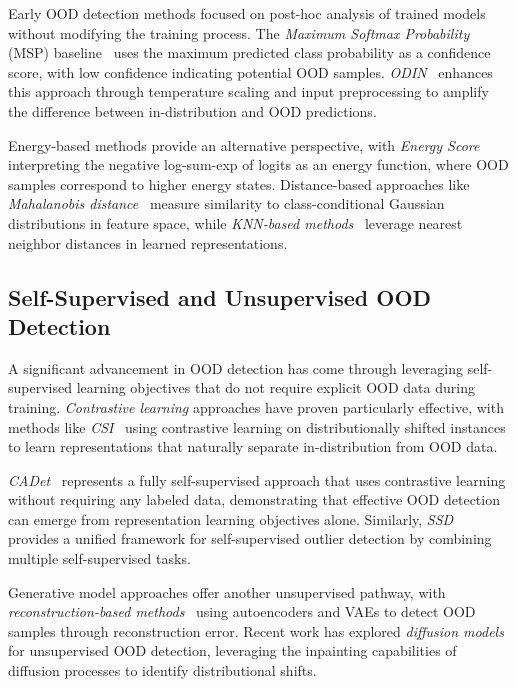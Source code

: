 \documentclass[11pt, oneside]{book}
\theoremstyle{plain}
\theoremstyle{definition}
\theoremstyle{remark}
\begin{document}
Early OOD detection methods focused on post-hoc analysis of trained models without modifying the training process. The \emph{Maximum Softmax Probability} (MSP) baseline~\citep{hendrycks2016baseline} uses the maximum predicted class probability as a confidence score, with low confidence indicating potential OOD samples. \emph{ODIN}~\citep{liang2017enhancing} enhances this approach through temperature scaling and input preprocessing to amplify the difference between in-distribution and OOD predictions.

Energy-based methods provide an alternative perspective, with \emph{Energy Score}~\citep{liu2020energy} interpreting the negative log-sum-exp of logits as an energy function, where OOD samples correspond to higher energy states. Distance-based approaches like \emph{Mahalanobis distance}~\citep{lee2018simple} measure similarity to class-conditional Gaussian distributions in feature space, while \emph{KNN-based methods}~\citep{sun2022out} leverage nearest neighbor distances in learned representations.

\subsection{Self-Supervised and Unsupervised OOD Detection}

A significant advancement in OOD detection has come through leveraging self-supervised learning objectives that do not require explicit OOD data during training. \emph{Contrastive learning} approaches have proven particularly effective, with methods like \emph{CSI}~\citep{tack2020csi} using contrastive learning on distributionally shifted instances to learn representations that naturally separate in-distribution from OOD data.

\emph{CADet}~\citep{guille2024cadet} represents a fully self-supervised approach that uses contrastive learning without requiring any labeled data, demonstrating that effective OOD detection can emerge from representation learning objectives alone. Similarly, \emph{SSD}~\citep{sehwag2021ssd} provides a unified framework for self-supervised outlier detection by combining multiple self-supervised tasks.

Generative model approaches offer another unsupervised pathway, with \emph{reconstruction-based methods}~\citep{zhou2022rethinking} using autoencoders and VAEs to detect OOD samples through reconstruction error. Recent work has explored \emph{diffusion models}~\citep{liu2023unsupervised} for unsupervised OOD detection, leveraging the inpainting capabilities of diffusion processes to identify distributional shifts.
\end{document}
